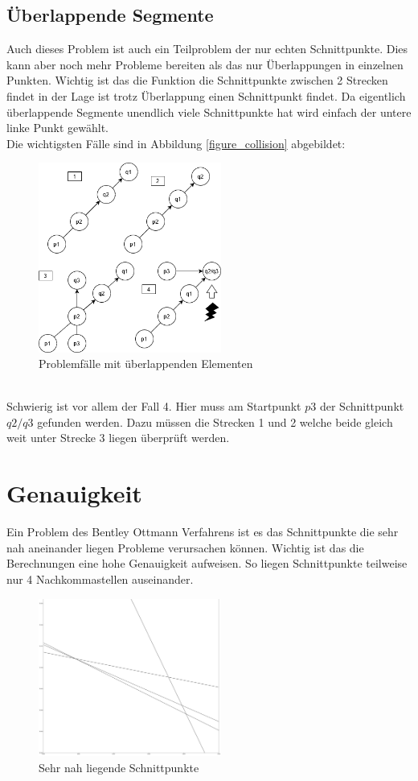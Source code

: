 \documentclass[conference]{IEEEtran}
\begin{document}
	\subsection{Überlappende Segmente}
	Auch dieses Problem ist auch ein Teilproblem der nur echten Schnittpunkte. Dies kann aber noch mehr Probleme bereiten als das nur Überlappungen in einzelnen Punkten. Wichtig ist das die Funktion die Schnittpunkte zwischen 2 Strecken findet in der Lage ist trotz Überlappung einen Schnittpunkt findet. Da eigentlich überlappende Segmente unendlich viele Schnittpunkte hat wird einfach der untere linke Punkt gewählt.\\
	Die wichtigsten Fälle sind in Abbildung \ref{figure_collision} abgebildet:
	\begin{figure}[h]
		\begin{center}
			\includegraphics[width=6cm]{ProblemUberlappen.png}
			\caption{Problemfälle mit überlappenden Elementen}
			\label{figure_3}
		\end{center}
	\end{figure}\\
	Schwierig ist vor allem der Fall 4. Hier muss am Startpunkt $p3$ der Schnittpunkt $q2/q3$ gefunden werden. Dazu müssen die Strecken 1 und 2 welche beide gleich weit unter Strecke 3 liegen überprüft werden.
	
	\section{Genauigkeit}
	Ein Problem des Bentley Ottmann Verfahrens ist es das Schnittpunkte die sehr nah aneinander liegen Probleme verursachen können. Wichtig ist das die Berechnungen eine hohe Genauigkeit aufweisen. So liegen Schnittpunkte teilweise nur 4 Nachkommastellen auseinander.
	\begin{figure}[h]
		\begin{center}
			\includegraphics[width=6cm]{CloseIntersections.png}
			\caption{Sehr nah liegende Schnittpunkte}
			\label{figure_3}
		\end{center}
	\end{figure}\\
\end{document}
